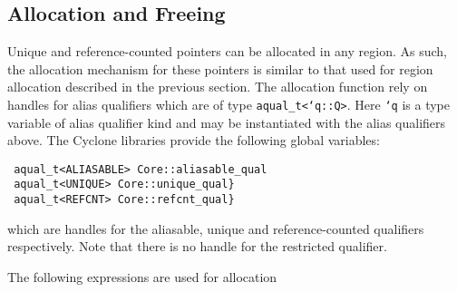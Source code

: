 \subsection{Allocation and Freeing}

Unique and reference-counted pointers can be allocated in any
region. As such, the allocation mechanism for these pointers is
similar to that used for region allocation described in the previous
section. The allocation function rely on handles for alias qualifiers
which are of type {\tt aqual\_t<`q::Q>}. Here {\tt `q} is a type
variable of alias qualifier kind and may be instantiated with the
alias qualifiers above. The Cyclone libraries provide the following global
variables:
\begin{verbatim}
 aqual_t<ALIASABLE> Core::aliasable_qual
 aqual_t<UNIQUE> Core::unique_qual} 
 aqual_t<REFCNT> Core::refcnt_qual} 
\end{verbatim}

which are handles for the aliasable, unique and reference-counted
qualifiers respectively. Note that there is no handle for the
restricted qualifier. 

The following expressions are used for allocation

